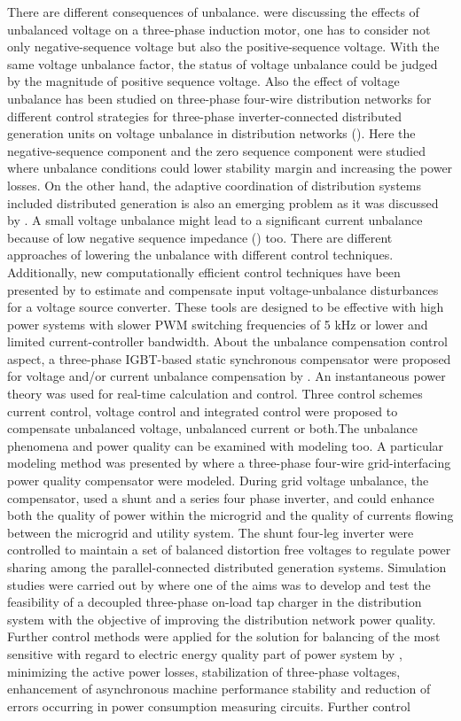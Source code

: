 There are different consequences of unbalance. \cite{lee1998effects} were discussing the effects of unbalanced voltage on a three-phase induction motor, one has to consider not only negative-sequence voltage but also the positive-sequence voltage. With the same voltage unbalance factor, the status of voltage unbalance could be judged by the magnitude of positive sequence voltage. Also the effect of voltage unbalance has been studied on three-phase four-wire distribution networks for different control strategies for three-phase inverter-connected distributed generation units on voltage unbalance in distribution networks (\cite{meersman2011three}). Here the negative-sequence component and the zero sequence component were studied where unbalance conditions could lower stability margin and increasing the power losses. On the other hand, the adaptive coordination of distribution systems included distributed generation is also an emerging problem as it was discussed by \cite{ates2016}.  A small voltage unbalance might lead to a significant current unbalance because of low negative sequence impedance (\cite{bina2011three}) too. There are different approaches of lowering the unbalance with different control techniques. Additionally, new computationally efficient control techniques have been presented by \cite{lee2009new} to estimate and compensate input voltage-unbalance disturbances for a voltage source converter. These tools are designed to be effective with high power systems with slower PWM switching frequencies of 5 kHz or lower and limited current-controller bandwidth. About the unbalance compensation control aspect, a three-phase IGBT-based static synchronous compensator were proposed for voltage and/or current unbalance compensation by \cite{xu2010voltage}. An instantaneous power theory was used for real-time calculation and control. Three control schemes current control, voltage control and integrated control were proposed to compensate unbalanced voltage, unbalanced current or both.The unbalance phenomena and power quality can be examined with modeling too. A particular modeling method was presented by \cite{li2005microgrid} where a three-phase four-wire grid-interfacing power quality compensator were modeled. During grid voltage unbalance, the compensator, used a shunt and a series four phase inverter, and could enhance both the quality of power within the microgrid and the quality of currents flowing between the microgrid and utility system. The shunt four-leg inverter were controlled to maintain a set of balanced distortion free voltages to regulate power sharing among the parallel-connected distributed generation systems. Simulation studies were carried out by \cite{Hu2016264} where one of the aims was to develop and test the feasibility of a decoupled three-phase on-load tap charger in the distribution system with the objective of improving the distribution network power quality. Further control methods were applied for the solution for balancing of the most sensitive with regard to electric energy quality part of power system by \cite{uimethod},  minimizing the active power losses, stabilization of three-phase voltages, enhancement of asynchronous machine performance stability and reduction of errors occurring in power consumption measuring circuits. Further control 